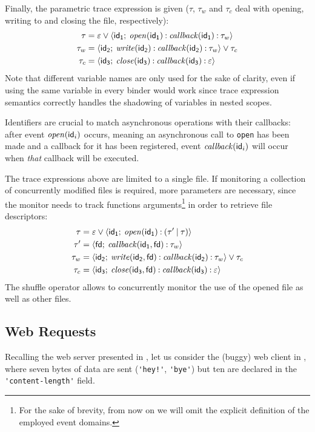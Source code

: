 Finally, the parametric trace expression is given (\(\tau\), \(\tau_w\) and \(\tau_c\) deal with opening, writing to and closing the file, respectively):
\begin{align*}
\tau &= \varepsilon \mathbin{\vee} {\langle}\mathsf{id_1};\:{\mathit{open}(\mathsf{id_1}) \mathbin{:} \mathit{callback}(\mathsf{id_1}) \mathbin{:} \tau_w}{\rangle}\\
\tau_w &= {\langle}\mathsf{id_2};\:{\mathit{write}(\mathsf{id_2}) \mathbin{:} \mathit{callback}(\mathsf{id_2}) \mathbin{:} \tau_w}{\rangle} \mathbin{\vee} \tau_c\\
\tau_c &= {\langle}\mathsf{id_3};\:{\mathit{close}(\mathsf{id_3}) \mathbin{:} \mathit{callback}(\mathsf{id_3}) \mathbin{:} \varepsilon}{\rangle}
\end{align*}
Note that different variable names are only used for the sake of clarity, even if using the same variable in every binder would work since trace expression semantics correctly handles the shadowing of variables in nested scopes.

Identifiers are crucial to match asynchronous operations with their callbacks: after event \(\mathit{open}(\mathsf{id}_i)\) occurs, meaning an asynchronous call to \lstinline|open| has been made and a callback for it has been registered, event \(\mathit{callback}(\mathsf{id}_i)\) will occur when \emph{that} callback will be executed.

The trace expressions above are limited to a single file.
If monitoring a collection of concurrently modified files is required, more parameters are necessary, since the monitor needs to track functions arguments\footnote{For the sake of brevity, from now on we will omit the explicit definition of the employed event domains.} in order to retrieve file descriptors:
\begin{align*}
\tau &= \varepsilon \mathbin{\vee} {\langle}\mathsf{id_1};\:{\mathit{open}(\mathsf{id_1}) \mathbin{:} (\tau' \mathbin{|} \tau)}{\rangle}\\
\tau' &= {\langle}\mathsf{fd};\:{\mathit{callback}(\mathsf{id_1}, \mathsf{fd}) \mathbin{:} \tau_w}{\rangle}\\
\tau_w &= {\langle}\mathsf{id_2};\:{\mathit{write}(\mathsf{id_2}, \mathsf{fd}) \mathbin{:} \mathit{callback}(\mathsf{id_2}) \mathbin{:} \tau_w}{\rangle} \mathbin{\vee} \tau_c\\
\tau_c &= {\langle}\mathsf{id_3};\:{\mathit{close}(\mathsf{id_3}, \mathsf{fd}) \mathbin{:} \mathit{callback}(\mathsf{id_3}) \mathbin{:} \varepsilon}{\rangle}
\end{align*}
The shuffle operator allows to concurrently monitor the use of the opened file as well as other files.

\subsection{Web Requests}
\label{sec:web-req}
Recalling the web server presented in , let us consider the (buggy) web client in , where seven bytes of data are sent (\lstinline{'hey!'}, \lstinline{'bye'}) but ten are declared in the \lstinline{'content-length'} field.

